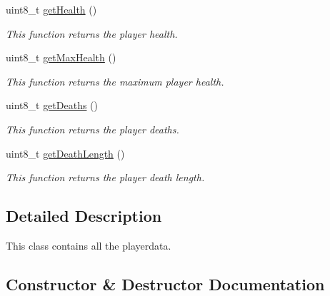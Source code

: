 \begin{DoxyCompactItemize}
\mbox{\label{class_player_data_a21e83200b940047a4f90a9588569f0e8}} 
uint8\+\_\+t \mbox{\hyperlink{class_player_data_a21e83200b940047a4f90a9588569f0e8}{get\+Health}} ()
\begin{DoxyCompactList}\small\item\em This function returns the player health. \end{DoxyCompactList}\item 
\mbox{\label{class_player_data_a9955efcfaa3b893ad984b78d5cf0f865}} 
uint8\+\_\+t \mbox{\hyperlink{class_player_data_a9955efcfaa3b893ad984b78d5cf0f865}{get\+Max\+Health}} ()
\begin{DoxyCompactList}\small\item\em This function returns the maximum player health. \end{DoxyCompactList}\item 
\mbox{\label{class_player_data_ac43afc297632fba65ae78e53c553780e}} 
uint8\+\_\+t \mbox{\hyperlink{class_player_data_ac43afc297632fba65ae78e53c553780e}{get\+Deaths}} ()
\begin{DoxyCompactList}\small\item\em This function returns the player deaths. \end{DoxyCompactList}\item 
\mbox{\label{class_player_data_aa6fa994c302c6aeaf1722bb7dd0b8cc0}} 
uint8\+\_\+t \mbox{\hyperlink{class_player_data_aa6fa994c302c6aeaf1722bb7dd0b8cc0}{get\+Death\+Length}} ()
\begin{DoxyCompactList}\small\item\em This function returns the player death length. \end{DoxyCompactList}\end{DoxyCompactItemize}


\subsection{Detailed Description}
This class contains all the playerdata. 

\subsection{Constructor \& Destructor Documentation}
\mbox{\label{class_player_data_aaf3e4cbb80f8eb74f946fd858df68f19}} 
